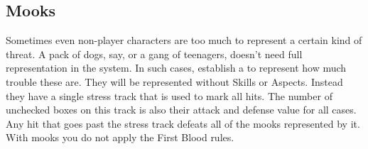 \subsection{Mooks}
\label{sec:Mooks}

Sometimes even non-player characters are too much to represent a certain kind of threat. A pack of dogs, say, or a gang of teenagers, doesn't need full representation in the system. In such cases,  establish a  to represent how much trouble these  are. They will be represented without Skills or Aspects. Instead they have a single stress track that is used to mark all hits. The number of unchecked boxes on this track is also their attack and defense value for all cases. Any hit that goes past the stress track defeats all of the mooks represented by it. With mooks you do not apply the First Blood rules.

